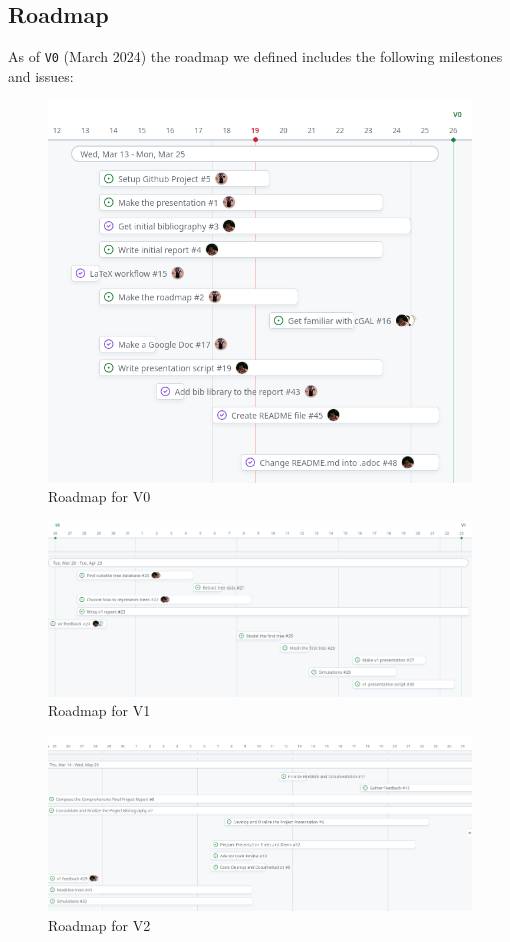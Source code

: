 \documentclass[12pt]{article}
\begin{document}
\subsection{Roadmap}
As of \texttt{V0} (March 2024) the roadmap we defined includes the following
milestones and issues:
\begin{figure}[H]
    \centering
    \includegraphics[width=1\textwidth]{images/roadmap_v0.png}
    \caption{Roadmap for V0}
\end{figure}

\begin{figure}[H]
    \centering
    \includegraphics[width=1\textwidth]{images/roadmap_v1.png}
    \caption{Roadmap for V1}
\end{figure}

\begin{figure}[H]
    \centering
    \includegraphics[width=1\textwidth]{images/roadmap_v2.png}
    \caption{Roadmap for V2}
\end{figure}
\end{document}
